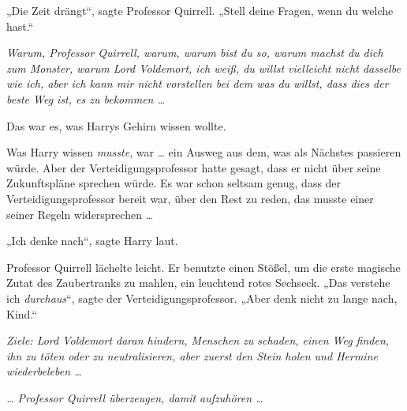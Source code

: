 „Die Zeit drängt“, sagte Professor Quirrell.
„Stell deine Fragen, wenn du welche hast.“

\emph{Warum, Professor Quirrell, warum, warum bist du so, warum machst du dich zum Monster, warum Lord Voldemort, ich weiß, du willst vielleicht nicht dasselbe wie ich, aber ich kann mir nicht vorstellen bei dem was du willst, dass \emph{dies} der beste Weg ist, es zu bekommen …}

Das war es, was Harrys Gehirn wissen wollte.

Was Harry wissen \emph{musste}, war … ein Ausweg aus dem, was als Nächstes passieren würde. Aber der Verteidigungsprofessor hatte gesagt, dass er nicht über seine Zukunftspläne sprechen würde. Es war schon seltsam genug, dass der Verteidigungsprofessor bereit war, über den Rest zu reden, das musste einer seiner Regeln widersprechen …

„Ich denke nach“, sagte Harry laut.

Professor Quirrell lächelte leicht. Er benutzte einen Stößel, um die erste magische Zutat des Zaubertranks zu mahlen, ein leuchtend rotes Sechseck.
„Das verstehe ich \emph{durchaus}“, sagte der Verteidigungsprofessor.
„Aber denk nicht zu lange nach, Kind.“

\emph{Ziele: Lord Voldemort daran hindern, Menschen zu schaden, einen Weg finden, ihn zu töten oder zu neutralisieren, aber zuerst den Stein holen und Hermine wiederbeleben …}

\emph{… Professor Quirrell überzeugen, damit aufzuhören …}

